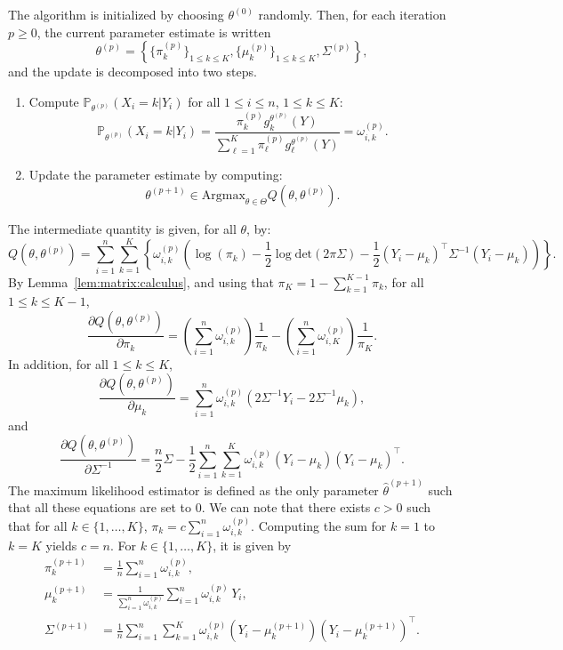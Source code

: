 \documentclass[english,graybox,envcountchap,envcountsame,sectrefs,shortlabels]{svmono}
\theoremstyle{style}
\newcommand{\eqsp}{}
\begin{document}
The algorithm is initialized by choosing $\theta^{(0)}$ randomly. Then, for each iteration $p\geq 0$, the current parameter estimate is written
$$
\theta^{(p)} = \left\{\{\pi^{(p)}_k\}_{1\leq k \leq K}, \{\mu^{(p)}_k\}_{1\leq k \leq K}, \Sigma^{(p)}\right\}\eqsp,
$$
and the update is decomposed into two steps.
\begin{enumerate}
\item Compute $\mathbb{P}_{\theta^{(p)}}(X_i = k|Y_i)$ for all $1\leq i \leq n$, $1\leq k \leq K$:
$$
\mathbb{P}_{\theta^{(p)}}(X_i = k|Y_i) = \frac{\pi^{(p)}_kg^{\theta^{(p)}}_k(Y)}{\sum_{\ell=1}^{K}\pi^{(p)}_\ell g^{\theta^{(p)}}_\ell(Y)} = \omega_{i,k}^{(p)}\eqsp.
$$
\item Update the parameter estimate by computing:
$$
\theta^{(p+1)} \in \mathrm{Argmax}_{\theta\in\Theta} Q(\theta,\theta^{(p)})\eqsp.
$$
\end{enumerate}
The intermediate quantity is given, for all $\theta$, by:
$$
Q(\theta,\theta^{(p)}) = \sum_{i=1}^n \sum_{k=1}^K \left\{ \omega_{i,k}^{(p)}\left( \log(\pi_k) -\frac{1}{2}\log \mathrm{det}(2\pi \Sigma) -\frac{1}{2}(Y_i - \mu_{k})^\top \Sigma^{-1}(Y_i - \mu_{k})\right) \right\} \eqsp.
$$
By Lemma~\ref{lem:matrix:calculus}, and using that $\pi_K = 1-\sum_{k=1}^{K-1}\pi_k$, for all $1\leq k \leq K-1$,
$$
\frac{\partial Q(\theta,\theta^{(p)}) }{\partial \pi_k} = \left(\sum_{i=1}^n\omega_{i,k}^{(p)}\right)\frac{1}{\pi_k} - \left(\sum_{i=1}^n\omega_{i,K}^{(p)}\right)\frac{1}{\pi_K}\eqsp.
$$
In addition, for all $1\leq k \leq K$,
$$
\frac{\partial Q(\theta,\theta^{(p)}) }{\partial \mu_k} = \sum_{i=1}^n \omega_{i,k}^{(p)} \left(2\Sigma^{-1}Y_i - 2\Sigma^{-1}\mu_{k}\right)\eqsp,
$$
and
$$
\frac{\partial Q(\theta,\theta^{(p)}) }{\partial \Sigma^{-1}} = \frac{n}{2}\Sigma -  \frac{1}{2}\sum_{i=1}^n\sum_{k=1}^K \omega_{i,k}^{(p)}\left(Y_i - \mu_{k}\right)\left(Y_i - \mu_{k}\right)^\top \eqsp.
$$
The maximum likelihood estimator is defined as the only parameter $\widehat \theta^{(p+1)}$ such that all these equations are set to 0. 
We can note that there exists $c>0$ such that for all $k\in\{1,\ldots,K\}$, $\pi_k = c\sum_{i=1}^n\omega_{i,k}^{(p)}$. Computing the sum for $k=1$ to $k=K$ yields $c=n$. For $k\in\{1,\ldots,K\}$,  it is given by
\begin{align*}
\pi_k^{(p+1)} &= \frac{1}{n}\sum_{i=1}^n\omega_{i,k}^{(p)}\eqsp,\\
\mu_k^{(p+1)} &= \frac{1}{\sum_{i=1}^n\omega_{i,k}^{(p)}}\sum_{i=1}^n\omega_{i,k}^{(p)}\,Y_i\eqsp,\\
\Sigma^{(p+1)} &= \frac{1}{n}\sum_{i=1}^n\sum_{k=1}^K\omega_{i,k}^{(p)}\left(Y_i - \mu_{k}^{(p+1)}\right)\left(Y_i - \mu_{k}^{(p+1)}\right)^\top\eqsp.
\end{align*}
\end{document}
